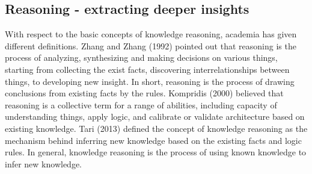 


\subsection{Reasoning - extracting deeper insights}


With respect to the basic concepts of knowledge reasoning, academia has
given different definitions. Zhang and Zhang (1992) pointed out
that reasoning is the process of analyzing, synthesizing and making decisions on various things, starting from collecting the exist
facts, discovering interrelationships between things, to developing
new insight. In short, reasoning is the process of drawing conclusions from existing facts by the rules. Kompridis (2000) believed
that reasoning is a collective term for a range of abilities, including
capacity of understanding things, apply logic, and calibrate or validate architecture based on existing knowledge. Tari (2013) defined
the concept of knowledge reasoning as the mechanism behind inferring new knowledge based on the existing facts and logic rules.
In general, knowledge reasoning is the process of using known
knowledge to infer new knowledge.

